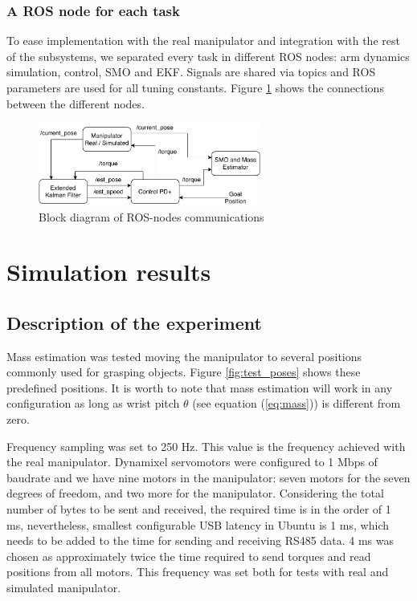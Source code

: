 \documentclass[a4paper, 10pt]{article}
\begin{document}
\subsubsection*{A ROS node for each task}
To ease implementation with the real manipulator and integration with the rest of the subsystems, we separated every task in different ROS nodes: arm dynamics simulation, control, SMO and EKF. Signals are shared via topics and ROS parameters are used for all tuning constants. Figure \ref{fig:RosNodes} shows the connections between the different nodes. 
\begin{figure}
  \centering
  \includegraphics[width=0.65\textwidth]{Figures/RosNodes.pdf}
  \caption{Block diagram of ROS-nodes communications}
  \label{fig:RosNodes}
\end{figure}


\section{Simulation results}
\label{sec:results}
\subsection{Description of the experiment}
Mass estimation was tested moving the manipulator to several positions commonly used for grasping objects. Figure \ref{fig:test_poses} shows these predefined positions. It is worth to note that mass estimation will work in any configuration as long as wrist pitch $\theta$ (see equation (\ref{eq:mass})) is different from zero. 

Frequency sampling was set to 250 Hz. This value is the frequency achieved with the real manipulator. Dynamixel servomotors were configured to 1 Mbps of baudrate and we have nine motors in the manipulator: seven motors for the seven degrees of freedom, and two more for the manipulator. Considering the total number of bytes to be sent and received, the required time is in the order of 1 ms, nevertheless, smallest configurable USB latency in Ubuntu is 1 ms, which needs to be added to the time for sending and receiving RS485 data. 4 ms was chosen as approximately twice the time required to send torques and read positions from all motors. This frequency was set both for tests with real and simulated manipulator. 
\end{document}
